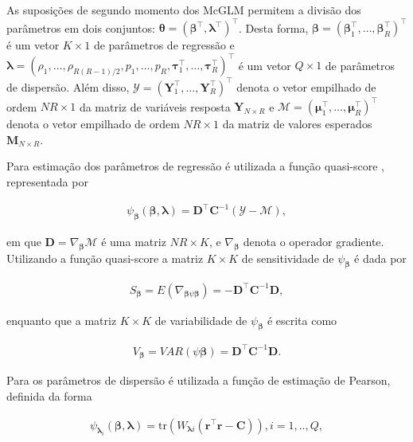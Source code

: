 \documentclass[AMA,STIX1COL]{WileyNJD-v2}
\begin{document}
As suposições de segundo momento dos McGLM permitem a divisão dos
parâmetros em dois conjuntos: $\boldsymbol{\theta} = (\boldsymbol{\beta}^{\top}, \boldsymbol{\lambda}^{\top})^{\top}$. Desta forma, $\boldsymbol{\beta} = (\boldsymbol{\beta}_1^\top, \ldots, \boldsymbol{\beta}_R^\top)^\top$ é um vetor $K \times 1$ de parâmetros de regressão e $\boldsymbol{\lambda} = (\rho_1, \ldots, \rho_{R(R-1)/2}, p_1, \ldots, p_R, \boldsymbol{\tau}_1^\top, \ldots, \boldsymbol{\tau}_R^\top)^\top$ é um vetor $Q \times 1$ de parâmetros de dispersão. Além disso, $\mathcal{Y} = (\boldsymbol{Y}_1^\top, \ldots, \boldsymbol{Y}_R^\top)^\top$ denota o vetor empilhado de ordem $NR \times 1$ da matriz de variáveis resposta $\boldsymbol{Y}_{N \times R}$ e $\mathcal{M} = (\boldsymbol{\mu}_1^\top, \ldots, \boldsymbol{\mu}_R^\top)^\top$ denota o vetor empilhado de ordem $NR \times 1$ da matriz de valores esperados $\boldsymbol{M}_{N \times R}$.

Para estimação dos parâmetros de regressão é utilizada a função quasi-score \cite{Liang86}, representada por

$$
\begin{aligned}
  \psi_{\boldsymbol{\beta}}(\boldsymbol{\beta},
  \boldsymbol{\lambda}) = \boldsymbol{D}^\top
  \boldsymbol{C}^{-1}(\mathcal{Y} - \mathcal{M}),
\end{aligned}
$$

\noindent em que $\boldsymbol{D} = \nabla_{\boldsymbol{\beta}} \mathcal{M}$ é uma matriz $NR \times K$, e $\nabla_{\boldsymbol{\beta}}$ denota o operador gradiente. Utilizando a função quasi-score a matriz $K \times K$ de sensitividade de $\psi_{\boldsymbol{\beta}}$ é dada por

$$
\begin{aligned}
S_{\boldsymbol{\beta}} = E(\nabla_{\boldsymbol{\beta} \psi \boldsymbol{\beta}}) = -\boldsymbol{D}^{\top} \boldsymbol{C}^{-1} \boldsymbol{D},
\end{aligned}
$$

\noindent enquanto que a matriz $K \times K$ de variabilidade de $\psi_{\boldsymbol{\beta}}$ é escrita como

$$
\begin{aligned}
V_{\boldsymbol{\beta}} = VAR(\psi \boldsymbol{\beta}) = \boldsymbol{D}^{\top} \boldsymbol{C}^{-1} \boldsymbol{D}.
\end{aligned}
$$

Para os parâmetros de dispersão é utilizada a função de estimação de Pearson, definida da forma

$$
  \begin{aligned}
    \psi_{\boldsymbol{\lambda}_i}(\boldsymbol{\beta},
    \boldsymbol{\lambda}) =
    \mathrm{tr}(W_{\boldsymbol{\lambda}i}
    (\boldsymbol{r}^\top\boldsymbol{r} -
    \boldsymbol{C})),  i = 1,.., Q, 
  \end{aligned}
$$
\end{document}
